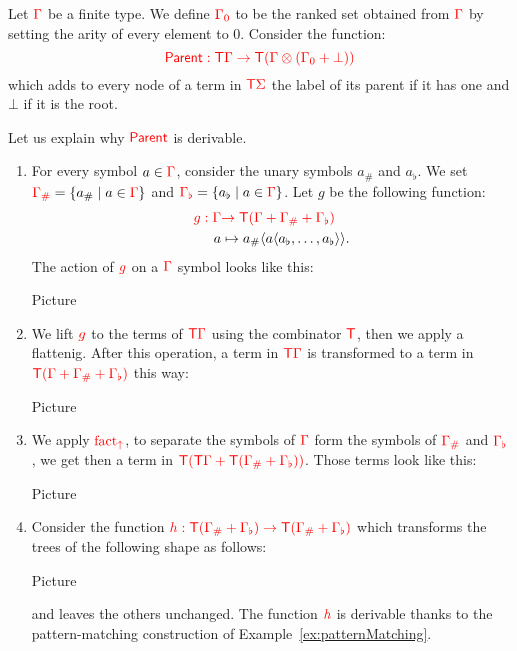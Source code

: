 \bigskip
\noindent \begin{example}\label{ex:patternMatching} 
\end{example}


\bigskip
\noindent \begin{example}  Let ${\color{red}{\Gamma}}$ be a finite type. We define ${\color{red}{{\color{red}{\Gamma}}_0}}$  to be the ranked set obtained from ${\color{red}{\Gamma}}$ by setting the arity of every element to $0$.  
\medskip
Consider the function:
$${\color{red}{ \mathsf{Parent}: {\color{red}{\mathsf T}}{\color{red}{\Gamma}}\to {\color{red}{\mathsf T}}({\color{red}{\Gamma}}\otimes ({\color{red}{\Gamma}}_0+\bot))}}$$
which adds to every node of a term in ${\color{red}{\mathsf T}} {\color{red}{\Sigma}}$ the label  of its parent if it has one and $\bot$ if it is the root.

Let us explain why ${\color{red}{\mathsf{Parent}}}$ is derivable. 
\begin{enumerate}
\item For every symbol $a\in {\color{red}{\Gamma}}$, consider the unary symbols $a_\#$ and $a_\flat$.
We set ${\color{red}{{\color{red}{\Gamma}}_\#}}=\{a_\#\mid a\in{\color{red}{\Gamma}}\}$ and ${\color{red}{{\color{red}{\Gamma}}_\flat}}=\{a_\flat\mid a\in{\color{red}{\Gamma}}\}$.
Let $g$ be the following function:
 \begin{align*}
{\color{red}{  g: {\color{red}{\Gamma}}}} &{\color{red}{\to {\color{red}{\mathsf T}}({\color{red}{\Gamma}}+{\color{red}{\Gamma}}_\#+{\color{red}{\Gamma}}_\flat)}}\\
  a &\mapsto a_\#\langle{a\langle{a_\flat,\dots,a_\flat}\rangle}\rangle.
\end{align*}
The action of ${\color{red}{g}}$ on a ${\color{red}{\Gamma}}$ symbol looks like this:
\begin{center}
Picture
\end{center}
\item We lift ${\color{red}{g}}$ to the terms of ${\color{red}{\mathsf T}} {\color{red}{\Gamma}}$ using the combinator ${\color{red}{\mathsf T}}$, then we apply a flattenig. After this operation, a term in ${\color{red}{\mathsf T}}{\color{red}{\Gamma}}$ is transformed to a term in ${\color{red}{{\color{red}{\mathsf T}}({\color{red}{\Gamma}}+{\color{red}{\Gamma}}_\#+{\color{red}{\Gamma}}_\flat)}}$ this way:
\begin{center}
Picture
\end{center}
\item We apply ${\color{red}{\mathrm{fact_{\uparrow}}}}$, to separate the symbols of ${\color{red}{\Gamma}}$ form the symbols of ${\color{red}{{\color{red}{\Gamma}}_\#}}$ and ${\color{red}{{\color{red}{\Gamma}}_\flat}}$, we get then a term in ${\color{red}{{\color{red}{\mathsf T}}({\color{red}{\mathsf T}}{\color{red}{\Gamma}}+{\color{red}{\mathsf T}}({\color{red}{\Gamma}}_\#+{\color{red}{\Gamma}}_\flat))}}$. Those terms look like this:
\begin{center}
Picture
\end{center}
\item Consider the function ${\color{red}{h:{\color{red}{\mathsf T}}({\color{red}{\Gamma}}_\#+{\color{red}{\Gamma}}_\flat)\to {\color{red}{\mathsf T}}({\color{red}{\Gamma}}_\#+{\color{red}{\Gamma}}_\flat)}}$ which transforms the trees of the following shape as follows:
\begin{center}
Picture
\end{center}
and leaves the others unchanged. 
The function ${\color{red}{h}}$ is derivable thanks to the pattern-matching construction of Example~\ref{ex:patternMatching}.


\end{enumerate}
\end{example}
